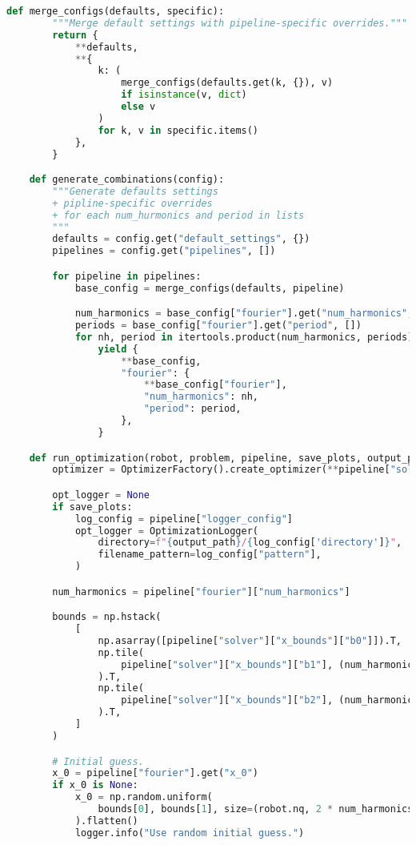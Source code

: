 \begin{lstlisting}[language=python, caption=\raggedright{generation/gen\_trajectory\_fourier.py}, frame=single]
    def merge_configs(defaults, specific):
        """Merge default settings with pipeline-specific overrides."""
        return {
            **defaults,
            **{
                k: (
                    merge_configs(defaults.get(k, {}), v)
                    if isinstance(v, dict)
                    else v
                )
                for k, v in specific.items()
            },
        }

    def generate_combinations(config):
        """Generate defaults settings
        + pipline-specific overrides
        + for each num_hurmonics and period in lists
        """
        defaults = config.get("default_settings", {})
        pipelines = config.get("pipelines", [])

        for pipeline in pipelines:
            base_config = merge_configs(defaults, pipeline)

            num_harmonics = base_config["fourier"].get("num_harmonics", [])
            periods = base_config["fourier"].get("period", [])
            for nh, period in itertools.product(num_harmonics, periods):
                yield {
                    **base_config,
                    "fourier": {
                        **base_config["fourier"],
                        "num_harmonics": nh,
                        "period": period,
                    },
                }

    def run_optimization(robot, problem, pipeline, save_plots, output_path):
        optimizer = OptimizerFactory().create_optimizer(**pipeline["solver"])

        opt_logger = None
        if save_plots:
            log_config = pipeline["logger_config"]
            opt_logger = OptimizationLogger(
                directory=f"{output_path}/{log_config['directory']}",
                filename_pattern=log_config["pattern"],
            )

        num_harmonics = pipeline["fourier"]["num_harmonics"]

        bounds = np.hstack(
            [
                np.asarray([pipeline["solver"]["x_bounds"]["b0"]]).T,
                np.tile(
                    pipeline["solver"]["x_bounds"]["b1"], (num_harmonics, 1)
                ).T,
                np.tile(
                    pipeline["solver"]["x_bounds"]["b2"], (num_harmonics, 1)
                ).T,
            ]
        )

        # Initial guess.
        x_0 = pipeline["fourier"].get("x_0")
        if x_0 is None:
            x_0 = np.random.uniform(
                bounds[0], bounds[1], size=(robot.nq, 2 * num_harmonics + 1)
            ).flatten()
            logger.info("Use random initial guess.")


\end{lstlisting}
